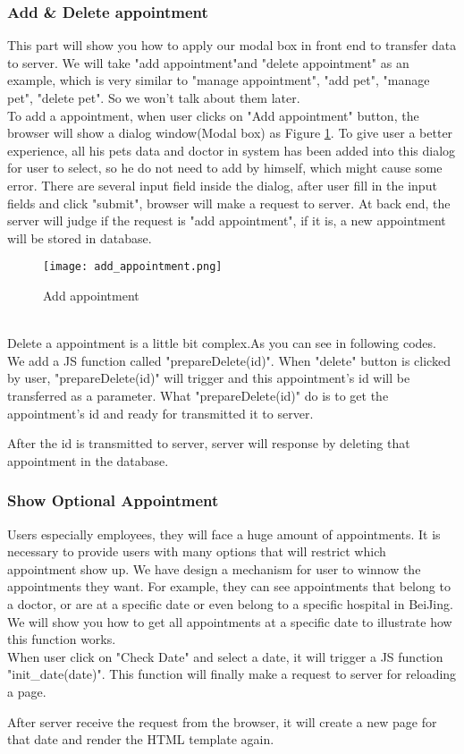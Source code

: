 \documentclass[a4paper]{article}
\begin{document}
\subsubsection{Add \& Delete appointment}
This part will show you how to apply our modal box in front end to transfer data to server. We will take "add appointment"and "delete appointment" as an example, which is very similar to "manage appointment", "add pet", "manage pet", "delete pet". So we won't talk about them later.
\quad\\
To add a appointment, when user clicks on "Add appointment" button, the browser will show a dialog window(Modal box) as Figure \ref{add_appointment}. To give user a better experience, all his pets data and doctor in system has been added into this dialog for user to select, so he do not need to add by himself, which might cause some error. There are several input field inside the dialog, after user fill in the input fields and click "submit", browser will make a request to server. At back end, the server will judge if the request is "add appointment", if it is, a new appointment will be stored in database.
\begin{figure}[h]
    \centering
    \texttt{[image: add\_appointment.png]}
    \caption{Add appointment}
    \label{add_appointment}
\end{figure}
\quad\\
Delete a appointment is a little bit complex.As you can see in following codes. We add a JS function called "prepareDelete(id)". When "delete" button is clicked by user, "prepareDelete(id)" will trigger and this appointment's id will be transferred as a parameter. What "prepareDelete(id)" do is to get the appointment's id and ready for transmitted it to server. 

After the id is transmitted to server, server will response by deleting that appointment in the database.

\subsubsection{Show Optional Appointment}
Users especially employees, they will face a huge amount of appointments. It is necessary to provide users with many options that will restrict which appointment show up. We have design a mechanism for user to winnow the appointments they want. For example, they can see appointments that belong to a doctor, or are at a specific date or even belong to a specific hospital in BeiJing. We will show you how to get all appointments at a specific date to illustrate how this function works.
\quad\\
When user click on "Check Date" and select a date, it will trigger a JS function "init\_date(date)". This function will finally make a request to server for reloading a page.

After server receive the request from the browser, it will create a new page for that date and render the HTML template again.
\end{document}
